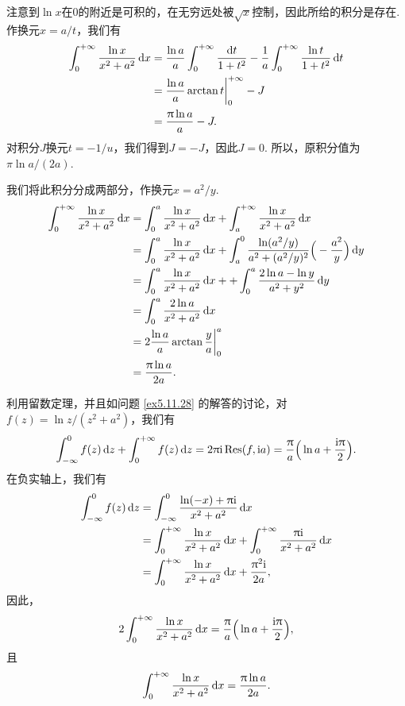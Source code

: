 \begin{ans}
  \method  注意到$\ln x$在0的附近是可积的，在无穷远处被$\sqrt x$控制，因此所给的积分是存在. 作换元$x=a/t$，我们有
  \begin{align*}
    \int_0^{+\infty} \frac{\ln x} {x^2+a^2} \,\mathrm dx
    & = \frac{\ln a}a\int_0^{+\infty}\frac{\mathrm dt}{1+t^2} - \frac1a \int_0^{+\infty}\frac{\ln t}{1+t^2}
    \,\mathrm dt\\
    & = \frac{\ln a}a\arctan t\bigg|_0^{+\infty} -J\\
    & = \frac{\uppi\ln a}a - J.
  \end{align*}
  对积分$J$换元$t=-1/u$，我们得到$J=-J$，因此$J=0$. 所以，原积分值为$\pi\ln a/(2a)$.

  \method 我们将此积分分成两部分，作换元$x=a^2/y$.
  \begin{align*}
    \int_0^{+\infty}\frac{\ln x}{x^2+a^2}\,\mathrm dx
    & = \int_0^{a}\frac{\ln x}{x^2+a^2}\,\mathrm dx +
    \int_a^{+\infty}\frac{\ln x}{x^2+a^2}\,\mathrm dx\\
    & = \int_0^{a}\frac{\ln x}{x^2+a^2}\,\mathrm dx +
    \int_a^0\frac{\ln (a^2/y)}{a^2+(a^2/y)^2}
    \Big( -\frac{a^2}y \Big)\,\mathrm dy \\
    & = \int_0^{a}\frac{\ln x}{x^2+a^2}\,\mathrm dx +
      + \int_0^a\frac{2\ln a - \ln y}{a^2+y^2}\,\mathrm dy\\
    & = \int_0^{a}\frac{2\ln a}{x^2+a^2}\,\mathrm dx\\
    & = 2\frac{\ln a}a\arctan\frac ya\bigg|_0^a\\
    & = \frac{\uppi\ln a}{2a}.
  \end{align*}

  \method 利用留数定理，并且如问题 \ref{ex5.11.28} 的解答的讨论，对$f(z)=\ln z/(z^2+a^2)$，我们有
  \[
    \int_{-\infty}^0f(z)\,\mathrm dz + \int_0^{+\infty} f(z)\,\mathrm dz
    = 2\uppi\mathrm i\operatorname*{Res}(f,\mathrm i a)=\frac{\uppi} a\Big(
      \ln a+ \frac{\mathrm i\uppi}2
    \Big).
  \]
  在负实轴上，我们有
  \begin{align*}
    \int_{-\infty}^0f(z)\,\mathrm dz & = \int_{-\infty}^0
    \frac{\ln(-x) + \uppi\mathrm i}{x^2+a^2}\,\mathrm dx\\
    & = \int_0^{+\infty}\frac{\ln x}{x^2+a^2}\,\mathrm dx
      + \int_0^{+\infty}\frac{\uppi \mathrm i}{x^2+a^2}\,\mathrm dx\\
    & = \int_0^{+\infty}\frac{\ln x}{x^2+a^2}\,\mathrm dx + \frac{\uppi^2\mathrm i}{2a},
  \end{align*}
  因此，
  \[
    2\int_0^{+\infty}\frac{\ln x}{x^2+a^2}\,\mathrm dx
    = \frac{\uppi} a\Big(\ln a+ \frac{\mathrm i\uppi}2\Big),
  \]
  且
  \[ \int_0^{+\infty}\frac{\ln x}{x^2+a^2}\,\mathrm dx=\frac{\uppi\ln a}{2a}. \]
\end{ans}

